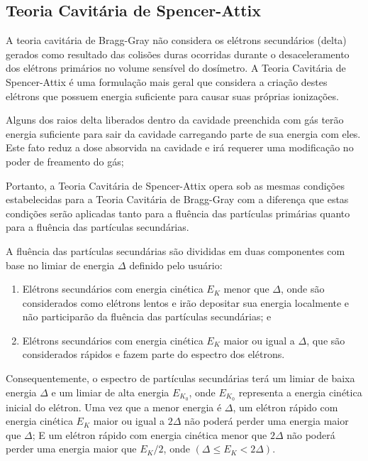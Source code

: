 \documentclass[11pt,a4paper]{article}
\begin{document}
		\subsection{Teoria Cavitária de Spencer-Attix}

			A teoria cavitária de Bragg-Gray não considera os elétrons secundários (delta) gerados como resultado das colisões duras ocorridas durante o desaceleramento dos elétrons primários no volume sensível do dosímetro. A Teoria Cavitária de Spencer-Attix é uma formulação mais geral que considera a criação destes elétrons que possuem energia suficiente para causar suas próprias ionizações. 

			Alguns dos raios delta liberados dentro da cavidade preenchida com gás terão energia suficiente para sair da cavidade carregando parte de sua energia com eles. Este fato reduz a dose absorvida na cavidade e irá requerer uma modificação no poder de freamento do gás; 

			Portanto, a Teoria Cavitária de Spencer-Attix opera sob as mesmas condições estabelecidas para a Teoria Cavitária de Bragg-Gray com a diferença que estas condições serão aplicadas tanto para a fluência das partículas primárias quanto para a fluência das partículas secundárias.

			A fluência das partículas secundárias são divididas em duas componentes com base no limiar de energia $\Delta$ definido pelo usuário:

			\begin{enumerate}
				\item Elétrons secundários com energia cinética $E_K$ menor que $\Delta$, onde são considerados como elétrons lentos e irão depositar sua energia localmente e não participarão da fluência das partículas secundárias; e
				\item Elétrons secundários com energia cinética $E_K$ maior ou igual a $\Delta$, que são considerados rápidos e fazem parte do espectro dos elétrons. 
			\end{enumerate}

			Consequentemente, o espectro de partículas secundárias terá um limiar de baixa energia $\Delta$ e um limiar de alta energia $E_{K_0}$, onde $E_{K_0}$ representa a energia cinética inicial do elétron. Uma vez que a menor energia é $\Delta$, um elétron rápido com energia cinética $E_{K}$ maior ou igual a $2\Delta$ não poderá perder uma energia maior que $\Delta$; E um elétron rápido com energia cinética menor que $2\Delta$ não poderá perder uma energia maior que $E_K/2$, onde $(\Delta \leq E_K < 2\Delta)$. 
\end{document}
